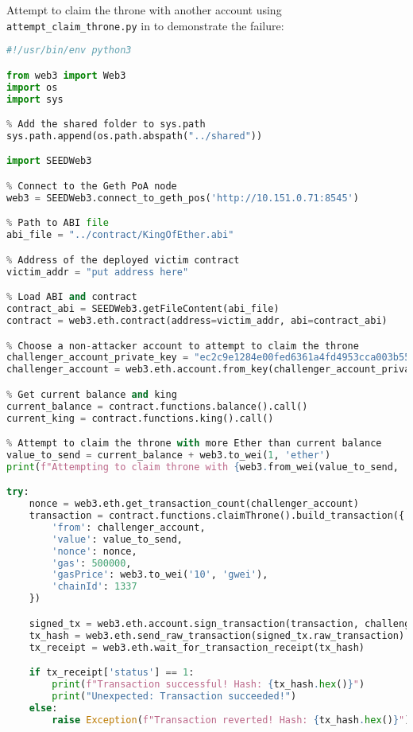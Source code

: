Attempt to claim the throne with another account using \texttt{attempt\_claim\_throne.py} in  to demonstrate the failure:

\begin{lstlisting}[language=python, caption={Attempting to claim throne (\texttt{attempt\_claim\_throne.py})}]
#!/usr/bin/env python3

from web3 import Web3
import os
import sys

% Add the shared folder to sys.path
sys.path.append(os.path.abspath("../shared"))

import SEEDWeb3

% Connect to the Geth PoA node
web3 = SEEDWeb3.connect_to_geth_pos('http://10.151.0.71:8545')

% Path to ABI file
abi_file = "../contract/KingOfEther.abi"

% Address of the deployed victim contract
victim_addr = "put address here"

% Load ABI and contract
contract_abi = SEEDWeb3.getFileContent(abi_file)
contract = web3.eth.contract(address=victim_addr, abi=contract_abi)

% Choose a non-attacker account to attempt to claim the throne
challenger_account_private_key = "ec2c9e1284e00fed6361a4fd4953cca003b557830e6431b18205ee350c25fb37"
challenger_account = web3.eth.account.from_key(challenger_account_private_key).address

% Get current balance and king
current_balance = contract.functions.balance().call()
current_king = contract.functions.king().call()

% Attempt to claim the throne with more Ether than current balance
value_to_send = current_balance + web3.to_wei(1, 'ether')
print(f"Attempting to claim throne with {web3.from_wei(value_to_send, 'ether')} ETH from {challenger_account}...")

try:
    nonce = web3.eth.get_transaction_count(challenger_account)
    transaction = contract.functions.claimThrone().build_transaction({
        'from': challenger_account,
        'value': value_to_send,
        'nonce': nonce,
        'gas': 500000,
        'gasPrice': web3.to_wei('10', 'gwei'),
        'chainId': 1337
    })

    signed_tx = web3.eth.account.sign_transaction(transaction, challenger_account_private_key)
    tx_hash = web3.eth.send_raw_transaction(signed_tx.raw_transaction)
    tx_receipt = web3.eth.wait_for_transaction_receipt(tx_hash)

    if tx_receipt['status'] == 1:
        print(f"Transaction successful! Hash: {tx_hash.hex()}")
        print("Unexpected: Transaction succeeded!")
    else:
        raise Exception(f"Transaction reverted! Hash: {tx_hash.hex()}")


\end{lstlisting}
